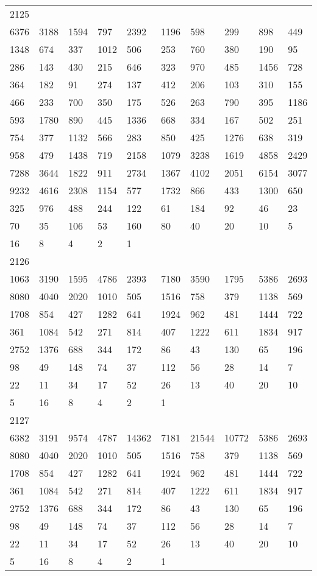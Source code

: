 \begin{longtable}{*{10}{l}}
2125&&&&&&&&&\\
6376& 3188& 1594& 797& 2392& 1196& 598& 299& 898& 449\\
1348& 674& 337& 1012& 506& 253& 760& 380& 190& 95\\
286& 143& 430& 215& 646& 323& 970& 485& 1456& 728\\
364& 182& 91& 274& 137& 412& 206& 103& 310& 155\\
466& 233& 700& 350& 175& 526& 263& 790& 395& 1186\\
593& 1780& 890& 445& 1336& 668& 334& 167& 502& 251\\
754& 377& 1132& 566& 283& 850& 425& 1276& 638& 319\\
958& 479& 1438& 719& 2158& 1079& 3238& 1619& 4858& 2429\\
7288& 3644& 1822& 911& 2734& 1367& 4102& 2051& 6154& 3077\\
9232& 4616& 2308& 1154& 577& 1732& 866& 433& 1300& 650\\
325& 976& 488& 244& 122& 61& 184& 92& 46& 23\\
70& 35& 106& 53& 160& 80& 40& 20& 10& 5\\
16& 8& 4& 2& 1& \\

2126&&&&&&&&&\\
1063& 3190& 1595& 4786& 2393& 7180& 3590& 1795& 5386& 2693\\
8080& 4040& 2020& 1010& 505& 1516& 758& 379& 1138& 569\\
1708& 854& 427& 1282& 641& 1924& 962& 481& 1444& 722\\
361& 1084& 542& 271& 814& 407& 1222& 611& 1834& 917\\
2752& 1376& 688& 344& 172& 86& 43& 130& 65& 196\\
98& 49& 148& 74& 37& 112& 56& 28& 14& 7\\
22& 11& 34& 17& 52& 26& 13& 40& 20& 10\\
5& 16& 8& 4& 2& 1& \\

2127&&&&&&&&&\\
6382& 3191& 9574& 4787& 14362& 7181& 21544& 10772& 5386& 2693\\
8080& 4040& 2020& 1010& 505& 1516& 758& 379& 1138& 569\\
1708& 854& 427& 1282& 641& 1924& 962& 481& 1444& 722\\
361& 1084& 542& 271& 814& 407& 1222& 611& 1834& 917\\
2752& 1376& 688& 344& 172& 86& 43& 130& 65& 196\\
98& 49& 148& 74& 37& 112& 56& 28& 14& 7\\
22& 11& 34& 17& 52& 26& 13& 40& 20& 10\\
5& 16& 8& 4& 2& 1& \\


\end{longtable}
